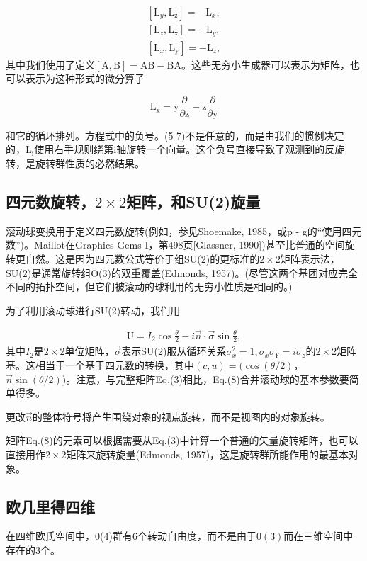 \begin{CJK}{UTF8}{gbsn}
\begin{align}
\left[\mathrm{L}_y, \mathrm{L}_{\mathrm{z}}\right]=-\mathrm{L}_x, \\
\left[\mathrm{L}_z, \mathrm{L}_{\mathrm{x}}\right]=-\mathrm{L}_y, \\
\left[\mathrm{L}_x, \mathrm{L}_{\mathrm{y}}\right]=-\mathrm{L}_z,
\end{align}
其中我们使用了定义$[\mathrm{A}, \mathrm{B}]=\mathrm{AB}-\mathrm{BA}$。这些无穷小生成器可以表示为矩阵，也可以表示为这种形式的微分算子


$$
\mathrm{L}_{\mathrm{x}}=\mathrm{y} \frac{\partial}{\partial \mathrm{z}}-\mathrm{z} \frac{\partial}{\partial \mathrm{y}}
$$

和它的循环排列。方程式中的负号。(5-7)不是任意的，而是由我们的惯例决定的，$\mathrm{L}_{\mathrm{i}}$使用右手规则绕第i轴旋转一个向量。这个负号直接导致了观测到的反旋转，是旋转群性质的必然结果。


\subsection*{四元数旋转，$2 \times 2$矩阵，和SU(2)旋量}
滚动球变换用于定义四元数旋转(例如，参见Shoemake, 1985，或p - g的“使用四元数”)。Maillot在Graphics Gems I，第498页[Glassner, 1990])甚至比普通的空间旋转更自然。这是因为四元数公式等价于组SU(2)的更标准的$2 \times 2$矩阵表示法，SU(2)是通常旋转组O(3)的双重覆盖(Edmonds, 1957)。(尽管这两个基团对应完全不同的拓扑空间，但它们被滚动的球利用的无穷小性质是相同的。)


为了利用滚动球进行SU(2)转动，我们用

\begin{align}
\mathrm{U}=I_{2} \cos \frac{\theta}{2}-i\vec{n} \cdot \vec{\sigma} \sin \frac{\theta}{2},
\end{align}
其中$I_{2}$是$2 \times 2$单位矩阵，$\vec{\sigma}$表示SU(2)服从循环关系$\sigma_x^{2}=1, \sigma_x \sigma_Y=i \sigma_z$的$2 \times 2$矩阵基。这相当于一个基于四元数的转换，其中$(c, u)=(\cos (\theta / 2)$， $\vec{n} \sin (\theta / 2)$)。注意，与完整矩阵Eq.(3)相比，Eq.(8)合并滚动球的基本参数要简单得多。

更改$\vec{n}$的整体符号将产生围绕对象的视点旋转，而不是视图内的对象旋转。


矩阵Eq.(8)的元素可以根据需要从Eq.(3)中计算一个普通的矢量旋转矩阵，也可以直接用作$2 \times 2$矩阵来旋转旋量(Edmonds, 1957)，这是旋转群所能作用的最基本对象。

\subsection*{欧几里得四维}
在四维欧氏空间中，0(4)群有6个转动自由度，而不是由于$0(3)$而在三维空间中存在的3个。



\end{CJK}
